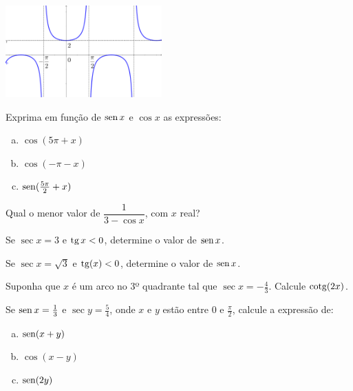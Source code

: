 \begin{secExercicios}
\begin{exer}
\begin{center}
        \includegraphics[width=6cm]{cap_trigon/figs/Grafico3.png}
    \end{center}
\end{exer}

\begin{exer}
     Exprima em função de $\operatorname{sen} x$ e $\cos x$ as expressões:
    \begin{enumerate}[a)]
        \item $\cos(5\pi +x)$
        \item $\cos(-\pi -x)$
        \item $\operatorname{sen}(\frac{5\pi}{2} +x)$
    \end{enumerate}
\end{exer}

\begin{exer}
    Qual o menor valor de $\dfrac{1}{3-\cos x}$, com $x$ real?
\end{exer}

\begin{exer}
    Se $\sec x=3$ e $\operatorname{tg} x<0$, determine o valor de $\operatorname{sen} x$.
\end{exer}

\begin{exer}
    Se $\sec x = \sqrt{3}$ e $\operatorname{tg}(x) < 0$, determine o valor de $\operatorname{sen} x$.
\end{exer}

\begin{exer}
    Suponha que $x$ é um arco no 3º quadrante tal que $\sec x = -\frac{4}{3}$. Calcule $\operatorname{cotg}(2x)$.
\end{exer}

\begin{exer}
    Se $\operatorname{sen} x = \frac{1}{3}$ e $\sec y= \frac{5}{4}$, onde $x$ e $y$ estão entre $0$ e $\frac{\pi}{2}$, calcule a expressão de:
    \begin{enumerate}[a)]
        \item $\operatorname{sen}(x+y)$
        \item $\cos(x-y)$
        \item $\operatorname{sen}(2y)$
    \end{enumerate}
\end{exer}



\end{secExercicios}
